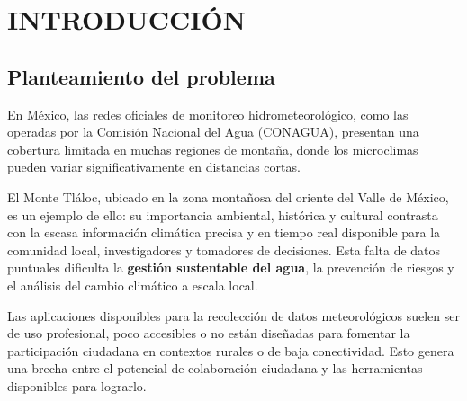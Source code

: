 \chapter{INTRODUCCIÓN}
\setcounter{page}{1}
















\section{Planteamiento del problema}

En México, las redes oficiales de monitoreo hidrometeorológico, como las operadas por la Comisión Nacional del Agua (CONAGUA), presentan una cobertura limitada en muchas regiones de montaña, donde los microclimas pueden variar significativamente en distancias cortas. %


El Monte Tláloc, ubicado en la zona montañosa del oriente del Valle de México, es un ejemplo de ello: su importancia ambiental, histórica y cultural contrasta con la escasa información climática precisa y en tiempo real disponible para la comunidad local, investigadores y tomadores de decisiones. Esta falta de datos puntuales dificulta la \textbf{gestión sustentable del agua}, la prevención de riesgos y el análisis del cambio climático a escala local.

Las aplicaciones disponibles para la recolección de datos meteorológicos suelen ser de uso profesional, poco accesibles o no están diseñadas para fomentar la participación ciudadana en contextos rurales o de baja conectividad. Esto genera una brecha entre el potencial de colaboración ciudadana y las herramientas disponibles para lograrlo.


